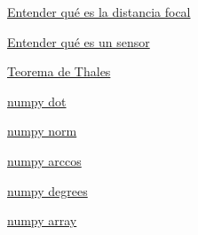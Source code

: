 \documentclass[12pt]{article}
\begin{document}
\href{https://www.sony.es/electronics/support/articles/00267921}{Entender qué es la distancia focal}

\href{https://www.blogdelfotografo.com/tipos-caracteristicas-ventajas-sensores-camaras-fotos/}{Entender qué es un sensor}

\href{https://www.superprof.es/apuntes/escolar/matematicas/geometria/basica/triangulos-en-posicion-de-thales.html}{Teorema de Thales}

\href{https://numpy.org/doc/stable/reference/generated/numpy.dot.html}{numpy dot}

\href{https://numpy.org/doc/stable/reference/generated/numpy.linalg.norm.html#numpy-linalg-norm}{numpy norm}

\href{https://numpy.org/doc/stable/reference/generated/numpy.arccos.html}{numpy arccos}

\href{https://numpy.org/doc/stable/reference/generated/numpy.degrees.html}{numpy degrees}

\href{https://numpy.org/doc/stable/reference/generated/numpy.array.html}{numpy array}
\end{document}
